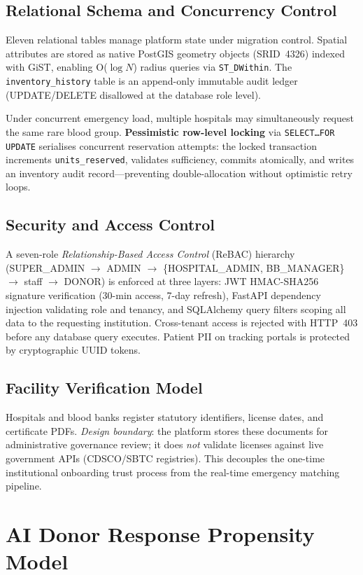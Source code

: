 \documentclass[conference]{IEEEtran}
\begin{document}
\subsection{Relational Schema and Concurrency Control}
Eleven relational tables manage platform state under migration control.
Spatial attributes are stored as native PostGIS geometry objects
(SRID~4326) indexed with GiST, enabling O(\(\log N\)) radius queries
via \texttt{ST\_DWithin}. The \texttt{inventory\_history} table is
an append-only immutable audit ledger (UPDATE/DELETE disallowed at the
database role level).

Under concurrent emergency load, multiple hospitals may simultaneously
request the same rare blood group. \textbf{Pessimistic row-level locking}
via \texttt{SELECT\ldots FOR UPDATE} serialises concurrent reservation
attempts: the locked transaction increments \texttt{units\_reserved},
validates sufficiency, commits atomically, and writes an inventory
audit record---preventing double-allocation without optimistic retry
loops.

\subsection{Security and Access Control}
A seven-role \emph{Relationship-Based Access Control} (ReBAC) hierarchy
(SUPER\_ADMIN $\to$ ADMIN $\to$ \{HOSPITAL\_ADMIN, BB\_MANAGER\}
$\to$ staff $\to$ DONOR) is enforced at three layers: JWT HMAC-SHA256
signature verification (30-min access, 7-day refresh), FastAPI
dependency injection validating role and tenancy, and SQLAlchemy query
filters scoping all data to the requesting institution. Cross-tenant
access is rejected with HTTP~403 before any database query executes.
Patient PII on tracking portals is protected by cryptographic UUID tokens.

\subsection{Facility Verification Model}
Hospitals and blood banks register statutory identifiers, license dates,
and certificate PDFs. \emph{Design boundary}: the platform stores these
documents for administrative governance review; it does \emph{not}
validate licenses against live government APIs (CDSCO/SBTC registries).
This decouples the one-time institutional onboarding trust process from
the real-time emergency matching pipeline.

\section{AI Donor Response Propensity Model}
\end{document}

